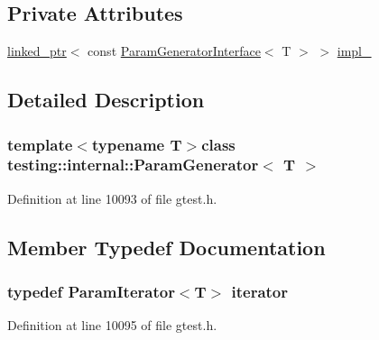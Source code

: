 \subsection*{\-Private \-Attributes}
\begin{DoxyCompactItemize}
\item 
\hyperlink{classtesting_1_1internal_1_1linked__ptr}{linked\-\_\-ptr}$<$ const \*
\hyperlink{classtesting_1_1internal_1_1ParamGeneratorInterface}{\-Param\-Generator\-Interface}$<$ \-T $>$ $>$ \hyperlink{classtesting_1_1internal_1_1ParamGenerator_a11bd1d693fccf0893a3bc3ceef1559a4}{impl\-\_\-}
\end{DoxyCompactItemize}


\subsection{\-Detailed \-Description}
\subsubsection*{template$<$typename \-T$>$class testing\-::internal\-::\-Param\-Generator$<$ T $>$}



\-Definition at line 10093 of file gtest.\-h.



\subsection{\-Member \-Typedef \-Documentation}
\hypertarget{classtesting_1_1internal_1_1ParamGenerator_a6b7c61f075b1727c4b8fbc849b7d9a95}{
\subsubsection[{iterator}]{\setlength{\rightskip}{0pt plus 5cm}typedef {\bf \-Param\-Iterator}$<$\-T$>$ {\bf iterator}}}\label{db/d6b/classtesting_1_1internal_1_1ParamGenerator_a6b7c61f075b1727c4b8fbc849b7d9a95}


\-Definition at line 10095 of file gtest.\-h.



